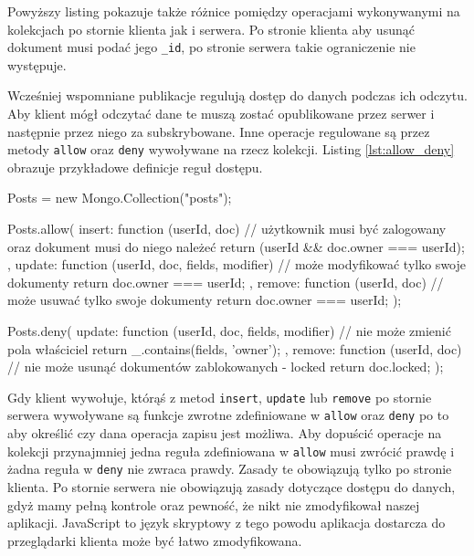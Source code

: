 Powyższy listing pokazuje także różnice pomiędzy operacjami wykonywanymi na kolekcjach po stornie klienta jak i serwera. Po stronie klienta aby usunąć dokument musi podać jego \verb|_id|, po stronie serwera takie ograniczenie nie występuje. 

Wcześniej wspomniane publikacje regulują dostęp do danych podczas ich odczytu. Aby klient mógł odczytać dane te muszą zostać opublikowane przez serwer i następnie przez niego za subskrybowane. Inne operacje regulowane są przez metody \verb|allow| oraz \verb|deny| wywoływane na rzecz kolekcji. Listing \ref{lst:allow_deny} obrazuje przykładowe definicje reguł dostępu.
\begin{js}[caption={{Definicje \textit{allow} oraz \textit{deny}}},label={lst:allow_deny}]
Posts = new Mongo.Collection("posts");

Posts.allow({
  insert: function (userId, doc) {
    // użytkownik musi być zalogowany oraz dokument musi do niego należeć
    return (userId && doc.owner === userId);
  },
  update: function (userId, doc, fields, modifier) {
    // może modyfikować tylko swoje dokumenty
    return doc.owner === userId;
  },
  remove: function (userId, doc) {
    // może usuwać tylko swoje dokumenty
    return doc.owner === userId;
  }
});

Posts.deny({
  update: function (userId, doc, fields, modifier) {
    // nie może zmienić pola właściciel
    return _.contains(fields, 'owner');
  },
  remove: function (userId, doc) {
    // nie może usunąć dokumentów zablokowanych - locked
    return doc.locked;
  }
});
\end{js}

Gdy klient wywołuje, którąś z metod \verb|insert|, \verb|update| lub \verb|remove| po stornie serwera wywoływane są funkcje zwrotne zdefiniowane w \verb|allow| oraz \verb|deny| po to aby określić czy dana operacja zapisu jest możliwa. Aby dopuścić operacje na kolekcji przynajmniej jedna reguła zdefiniowana w \verb|allow| musi zwrócić prawdę i żadna reguła w \verb|deny| nie zwraca prawdy. Zasady te obowiązują tylko po stronie klienta. Po stornie serwera nie obowiązują zasady dotyczące dostępu do danych, gdyż mamy pełną kontrole oraz pewność, że nikt nie zmodyfikował naszej aplikacji. JavaScript to język skryptowy z tego powodu aplikacja dostarcza do przeglądarki klienta może być łatwo zmodyfikowana. 

